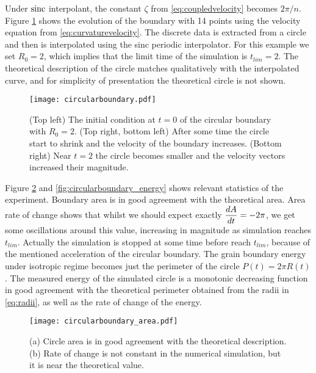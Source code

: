 Under $\operatorname{sinc}$ interpolant, the constant $\zeta$ from \eqref{eq:coupledvelocity} becomes $2\pi/n$. Figure \ref{fig:circularboundary} shows the evolution of the boundary with 14 points using the velocity equation from \eqref{eq:curvaturevelocity}. The discrete data is extracted from a circle and then is interpolated using the sinc periodic interpolator. For this example we set $R_0 = 2$, which implies that the limit time of the simulation is $t_{lim}=2$. The theoretical description of the circle matches qualitatively with the interpolated curve, and for simplicity of presentation the theoretical circle is not shown. 

\begin{figure}[t]
    \centering
    \texttt{[image: circularboundary.pdf]}
    \caption[Circular boundary evolution]{(Top left) The initial condition at $t=0$ of the circular boundary with $R_0 = 2$. (Top right, bottom left) After some time the circle start to shrink and the velocity of the boundary increases. (Bottom right) Near $t=2$ the circle becomes smaller and the velocity vectors increased their magnitude.}
    \label{fig:circularboundary}
\end{figure}

Figure \ref{fig:circularboundary_area} and \ref{fig:circularboundary_energy} shows relevant statistics of the experiment. Boundary area is in good agreement with the theoretical area. Area rate of change shows that whilst we should expect exactly $\dfrac{dA}{dt} = -2\pi$, we get some oscillations around this value, increasing in magnitude as simulation reaches $t_{lim}$. Actually the simulation is stopped at some time before reach $t_{lim}$, because of the mentioned acceleration of the circular boundary. The grain boundary energy under isotropic regime becomes just the perimeter of the circle $P(t) = 2\pi R(t)$. The measured energy of the simulated circle is a monotonic decreasing function in good agreement with the theoretical perimeter obtained from the radii in \eqref{eq:radii}, as well as the rate of change of the energy. 

\begin{figure}[t]
    \centering
    \texttt{[image: circularboundary\_area.pdf]}
    \subfloat[\label{fig:area}]{\hspace{.55\linewidth}}
    \subfloat[\label{fig:dAdt}]{\hspace{.45\linewidth}}
    \caption[Circular boundary area and rate of change]{(a) Circle area is in good agreement with the theoretical description. (b) Rate of change is not constant in the numerical simulation, but it is near the theoretical value.}
    \label{fig:circularboundary_area}
\end{figure}


